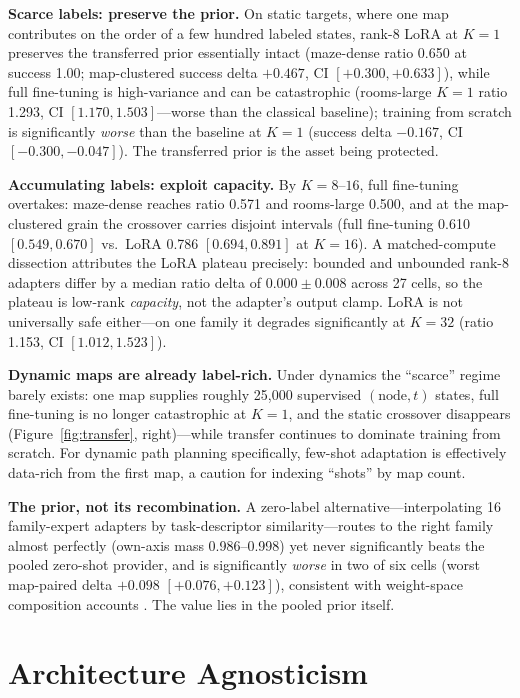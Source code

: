 \documentclass[letterpaper]{article} %
\begin{document}
\textbf{Scarce labels: preserve the prior.} On static targets, where one map contributes on the order of a few hundred labeled states, rank-8 LoRA at $K{=}1$ preserves the transferred prior essentially intact (maze-dense ratio 0.650 at success 1.00; map-clustered success delta $+0.467$, CI $[+0.300,+0.633]$), while full fine-tuning is high-variance and can be catastrophic (rooms-large $K{=}1$ ratio 1.293, CI $[1.170,1.503]$---worse than the classical baseline); training from scratch is significantly \emph{worse} than the baseline at $K{=}1$ (success delta $-0.167$, CI $[-0.300,-0.047]$). The transferred prior is the asset being protected.

\textbf{Accumulating labels: exploit capacity.} By $K{=}8$--$16$, full fine-tuning overtakes: maze-dense reaches ratio 0.571 and rooms-large 0.500, and at the map-clustered grain the crossover carries disjoint intervals (full fine-tuning 0.610 $[0.549,0.670]$ vs.\ LoRA 0.786 $[0.694,0.891]$ at $K{=}16$). A matched-compute dissection attributes the LoRA plateau precisely: bounded and unbounded rank-8 adapters differ by a median ratio delta of $0.000\pm0.008$ across 27 cells, so the plateau is low-rank \emph{capacity}, not the adapter's output clamp. LoRA is not universally safe either---on one family it degrades significantly at $K{=}32$ (ratio 1.153, CI $[1.012,1.523]$).

\textbf{Dynamic maps are already label-rich.} Under dynamics the ``scarce'' regime barely exists: one map supplies roughly 25{,}000 supervised $(\text{node},t)$ states, full fine-tuning is no longer catastrophic at $K{=}1$, and the static crossover disappears (Figure~\ref{fig:transfer}, right)---while transfer continues to dominate training from scratch. For dynamic path planning specifically, few-shot adaptation is effectively data-rich from the first map, a caution for indexing ``shots'' by map count.

\textbf{The prior, not its recombination.} A zero-label alternative---interpolating 16 family-expert adapters by task-descriptor similarity---routes to the right family almost perfectly (own-axis mass 0.986--0.998) yet never significantly beats the pooled zero-shot provider, and is significantly \emph{worse} in two of six cells (worst map-paired delta $+0.098$ $[+0.076,+0.123]$), consistent with weight-space composition accounts \citep{wortsman2022soups,ilharco2022task}. The value lies in the pooled prior itself.

\section{Architecture Agnosticism}
\end{document}
